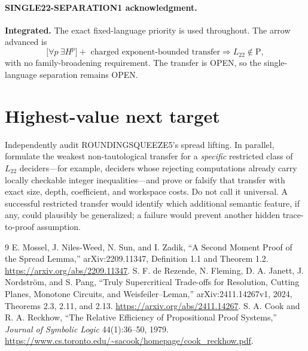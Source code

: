 \documentclass[11pt]{article}
\newcommand{\Ltwo}{L_{22}}
\begin{document}
\paragraph{SINGLE22-SEPARATION1 acknowledgment.}
\textbf{Integrated.} The exact fixed-language priority is used throughout.
The arrow advanced is
\[
 \bigl[\forall p\ \exists H^{p}\bigr]
 +\text{ charged exponent-bounded transfer}
 \Longrightarrow \Ltwo\notin\mathrm P,
\]
with no family-broadening requirement. The transfer is OPEN, so the
single-language separation remains OPEN.

\section{Highest-value next target}
Independently audit ROUNDINGSQUEEZE5's spread lifting. In parallel, formulate
the weakest non-tautological transfer for a \emph{specific} restricted class
of $\Ltwo$ deciders---for example, deciders whose rejecting computations
already carry locally checkable integer inequalities---and prove or falsify
that transfer with exact size, depth, coefficient, and workspace costs.
Do not call it universal. A successful restricted transfer would identify
which additional semantic feature, if any, could plausibly be generalized;
a failure would prevent another hidden trace-to-proof assumption.

\begin{thebibliography}{9}
E. Mossel, J. Niles-Weed, N. Sun, and I. Zadik,
``A Second Moment Proof of the Spread Lemma,'' arXiv:2209.11347,
Definition 1.1 and Theorem 1.2. \url{https://arxiv.org/abs/2209.11347}.
S. F. de Rezende, N. Fleming, D. A. Janett, J. Nordstr\"om, and S. Pang,
``Truly Supercritical Trade-offs for Resolution, Cutting Planes, Monotone
Circuits, and Weisfeiler--Leman,'' arXiv:2411.14267v1, 2024,
Theorems 2.3, 2.11, and 2.13.
\url{https://arxiv.org/abs/2411.14267}.
S. A. Cook and R. A. Reckhow,
``The Relative Efficiency of Propositional Proof Systems,''
\emph{Journal of Symbolic Logic} 44(1):36--50, 1979.
\url{https://www.cs.toronto.edu/~sacook/homepage/cook_reckhow.pdf}.
\end{thebibliography}
\end{document}
